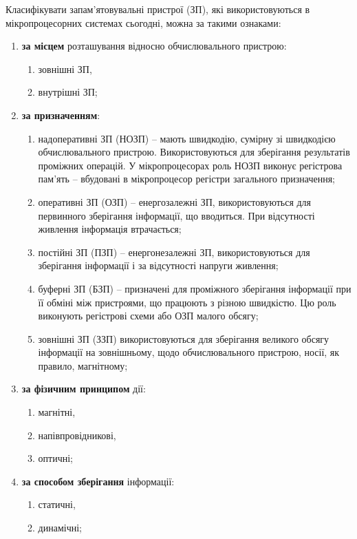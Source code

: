 Класифікувати запам'ятовувальні пристрої (ЗП), які використовуються в мікропроцесорних системах сьогодні, можна за такими ознаками:
\begin{enumerate}
 \item \textbf{за місцем} розташування відносно обчислювального прис\-трою:
   \begin{enumerate}
   \item зовнішні ЗП,
   \item внутрішні ЗП;
   \end{enumerate}
 \item \textbf{за призначенням}:
   \begin{enumerate}
   \item надоперативні ЗП (НОЗП) -- мають швидкодію, сумірну зі швидкодією обчислювального пристрою. Використо\-ву\-ють\-ся для зберігання результатів проміжних операцій. У мікропроцесорах роль НОЗП виконує регістрова пам'ять -- вбудовані в мікропроцесор регістри загального призначення;
   \item оперативні ЗП (ОЗП) -- енергозалежні ЗП, вико\-рис\-то\-ву\-ють\-ся для первинного зберігання інформації, що вво\-дить\-ся. При відсутності живлення інформація втрачається;
   \item постійні ЗП (ПЗП) -- енергонезалежні ЗП, ви\-ко\-рис\-то\-ву\-ють\-ся для зберігання інформації і за відсутності напруги живлення;
   \item буферні ЗП (БЗП) -- призначені для проміжного зберігання інформації при її обміні між пристроями, що працюють з різною швидкістю. Цю роль виконують регістрові схеми або ОЗП малого обсягу;
   \item зовнішні ЗП (ЗЗП) використовуються для зберігання великого обсягу інформації на зовнішньому, щодо обчислювального пристрою, носії, як правило, магнітному;
   \end{enumerate}\newpage
 \item \textbf{за фізичним принципом} дії:
   \begin{enumerate}
   \item магнітні,
   \item напівпровідникові,
   \item оптичні;
   \end{enumerate}
 \item \textbf{за способом зберігання} інформації:
   \begin{enumerate}
   \item статичні,
   \item динамічні;
   \end{enumerate}

\end{enumerate}
